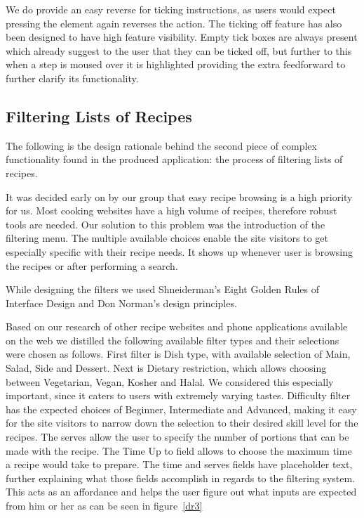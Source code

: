 We do provide an easy reverse for ticking instructions, as users would expect pressing the element again reverses the action. The ticking off feature has also been designed to have high feature visibility. Empty tick boxes are always present which already suggest to the user that they can be ticked off, but further to this when a step is moused over it is highlighted providing the extra feedforward to further clarify its functionality.

\subsection{Filtering Lists of Recipes}
The following is the design rationale behind the second piece of complex functionality found in the produced application: the process of filtering lists of recipes.

It was decided early on by our group that easy recipe browsing is a high priority for us. Most cooking websites have a high volume of recipes, therefore robust tools are needed. Our solution to this problem was the introduction of the filtering menu. The multiple available choices enable the site visitors to get especially specific with their recipe needs. It shows up whenever user is browsing the recipes or after performing a search.

While designing the filters we used Shneiderman’s Eight Golden Rules of Interface Design and Don Norman’s design principles.

Based on our research of other recipe websites and phone applications available on the web  we distilled the following available filter types and their selections were chosen as follows. First filter is Dish type, with available selection of Main, Salad, Side and Dessert. Next is Dietary restriction, which allows choosing between Vegetarian, Vegan, Kosher and Halal. We considered this especially important, since it caters to users with extremely varying tastes. Difficulty filter has the expected choices of Beginner, Intermediate and Advanced, making it easy for the site visitors to narrow down the selection to their desired skill level for the recipes. The serves allow the user to specify the number of portions that can be made with the recipe. The Time Up to field allows to choose the maximum time a recipe would take to prepare. The time and serves fields have placeholder text, further explaining what those fields accomplish in regards to the filtering system. This acts as an affordance and helps the user figure out what inputs are expected from him or her as can be seen in figure~\ref{dr3}

